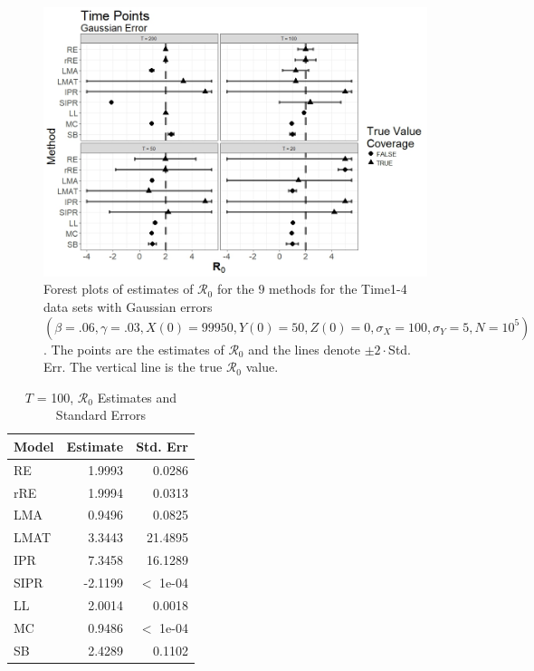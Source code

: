 \documentclass[12pt]{article}
\newcommand{\xxsir}{\ensuremath{9} } %
\newcommand{\rr}{\ensuremath{\mathcal{R}_0}}
\begin{document}
\begin{figure}[H]
  \centering
  \includegraphics[scale=0.5]{images/time_n.jpeg}
  \caption{Forest plots of estimates of $\rr$ for the \xxsir methods for the Time1-4 data sets with Gaussian errors $(\beta=.06, \gamma=.03, X(0)=99950, Y(0)=50, Z(0)=0, \sigma_X=100, \sigma_Y=5, N=10^5)$.  The points are the estimates of $\rr$ and the lines denote $\pm 2\cdot $Std. Err.  The vertical line is the true $\rr$ value.}\label{fig:time-res}
  \end{figure}


\begin{table}[H]
	

	\centering
	\begin{tabular}[t]{l|r|r}
		\hline
		Model & Estimate & Std. Err\\
		\hline
		RE & 1.9993 & 0.0286\\
		\hline
		rRE & 1.9994 & 0.0313\\
		\hline
		LMA & 0.9496 & 0.0825\\
		\hline
		LMAT & 3.3443 & 21.4895\\
		\hline
		IPR & 7.3458 & 16.1289\\
		\hline
		SIPR & -2.1199 & $<$ 1e-04\\
		\hline
		LL & 2.0014 & 0.0018\\
		\hline
		MC & 0.9486 & $<$ 1e-04\\
		\hline
		SB & 2.4289 & 0.1102\\
		\hline
	\end{tabular}
        \caption{ $T$ = 100, $\rr$ Estimates and Standard Errors}\label{tab:time-res1}
\end{table}
\end{document}
